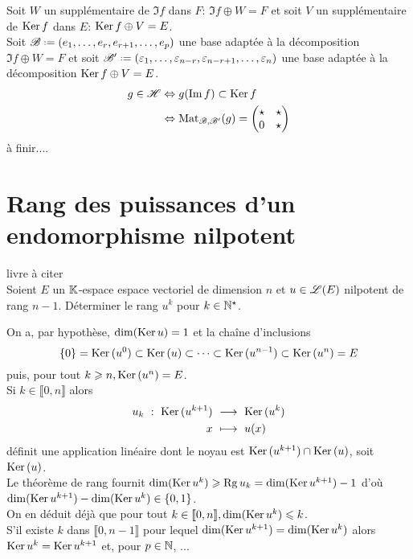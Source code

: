 \begin{solution}
    Soit $W$ un supplémentaire de $\Im f$ dans $F$: $\Im f \oplus W = F$ et soit $V$ un supplémentaire de $\mathrm{Ker}\, f$ dans $E$: $\mathrm{Ker}\, f \oplus V = E$. \\
    Soit $\mathscr{B} \defeq (e_1, \dots, e_r, e_{r+1}, \dots, e_p)$ une base adaptée à la décomposition $\Im f \oplus W = F$ et soit $\mathscr{B}' \defeq (\varepsilon_1, \dots, \varepsilon_{n-r}, \varepsilon_{n-r+1}, \dots, \varepsilon_n)$ une base adaptée à la décomposition $\mathrm{Ker}\, f \oplus V = E$.
    \begin{align*}
        g \in \mathscr{H} &\Leftrightarrow g(\Im f) \subset \mathrm{Ker}\, f \\
        &\Leftrightarrow \mathrm{Mat}_{\mathscr{B}, \mathscr{B}'}(g) = 
        \begin{pmatrix}
            \star & \star \\
            0 & \star
        \end{pmatrix}
    \end{align*}
    à finir....
\end{solution}

\section{Rang des puissances d'un endomorphisme nilpotent} 
\begin{exercice}
    livre à citer \\
    Soient $E$ un $\mathbb{K}$-espace espace vectoriel de dimension $n$ et $u \in \mathscr{L}(E)$ nilpotent de rang $n-1$. Déterminer le rang $u^k$ pour $k \in \mathbb{N}^\star$. 
\end{exercice}

\begin{solution}
    On a, par hypothèse, $\dim(\mathrm{Ker}\, u) = 1$ et la chaîne d'inclusions
    $$\{0\} = \mathrm{Ker}\,(u^0) \subset \mathrm{Ker}\,(u) \subset \cdots \subset \mathrm{Ker}\,(u^{n-1}) \subset \mathrm{Ker}\,(u^n) = E$$
    puis, pour tout $k \geqslant n, \mathrm{Ker}\,(u^n) = E$. \\
    Si $k \in \llbracket 0, n \rrbracket$ alors 
    \begin{alignat*}{2}
        u_k\ :\ \mathrm{Ker}\,(u^{k+1})\ &\longrightarrow\ \mathrm{Ker}\,(u^k)\\
        x\ &\longmapsto\ u(x)
    \end{alignat*}
    définit une application linéaire dont le noyau est $\mathrm{Ker}\,(u^{k+1}) \cap \mathrm{Ker}\,(u)$, soit $\mathrm{Ker}\,(u)$. \\
    Le théorème de rang fournit $\dim(\mathrm{Ker}\, u^k) \geqslant \mathrm{Rg}\, u_k = \dim( \mathrm{Ker}\, u^{k+1}) - 1$ d'où $\dim(\mathrm{Ker}\, u^{k+1}) - \dim(\mathrm{Ker}\, u^k) \in \{ 0, 1 \}$. \\
    On en déduit déjà que pour tout $k \in \llbracket 0, n \rrbracket, \dim(\mathrm{Ker}\, u^k) \leqslant k$. \\
    S'il existe $k$ dans $\llbracket 0, n-1 \rrbracket$ pour lequel $\dim( \mathrm{Ker}\, u^{k+1}) = \dim(\mathrm{Ker}\, u^k)$ alors $\mathrm{Ker}\, u^k = \mathrm{Ker}\, u^{k+1}$ et, pour $p \in \mathbb{N}$, 
    ...
\end{solution}

